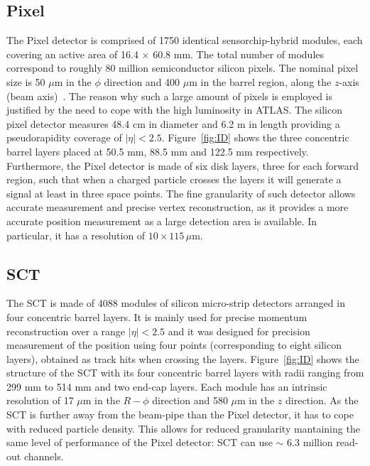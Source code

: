 			\subsection*{Pixel}
				
				The Pixel detector is comprised of 1750 identical sensorchip-hybrid modules, each covering an active area of 16.4 $\times$ 60.8 mm. The total number of modules correspond to roughly 80 million semiconductor silicon pixels. The nominal pixel size is 50 $\mu$m in the $\phi$ direction and 400 $\mu$m in the barrel region, along the $z$-axis (beam axis)~\cite{ATLASPix}. The reason why such a large amount of pixels is employed is justified by the need to cope with the high luminosity in ATLAS. The silicon pixel detector measures 48.4 cm in diameter and 6.2 m in length providing a pseudorapidity coverage of $\left|\eta\right| < 2.5$. Figure~\ref{fig:ID} shows the three concentric barrel layers placed at 50.5 mm, 88.5 mm and 122.5 mm respectively. Furthermore, the Pixel detector is made of six disk layers, three for each forward region, such that when a charged particle crosses the layers it will generate a signal at least in three space points. The fine granularity of such detector allows accurate measurement and precise vertex reconstruction, as it provides a more accurate position measurement as a large detection area is available. In particular, it has a resolution of $10 \times 115\,\mu$m.

			\subsection*{SCT}

				The SCT is made of 4088 modules of silicon micro-strip detectors arranged in four concentric barrel layers. It is mainly used for precise momentum reconstruction over a range $\left|\eta\right| < 2.5$ and it was designed for precision measurement of the position using four points (corresponding to eight silicon layers), obtained as track hits when crossing the layers. Figure~\ref{fig:ID} shows the structure of the SCT with its four concentric barrel layers with radii ranging from 299 mm to 514 mm and two end-cap layers. Each module has an intrinsic resolution of 17 $\mu$m in the $R-\phi$ direction and 580 $\mu$m in the $z$ direction. As the SCT is further away from the beam-pipe than the Pixel detector, it has to cope with reduced particle density. This allows for reduced granularity mantaining the same level of performance of the Pixel detector: SCT can use $\sim$ 6.3 million read-out channels.%


